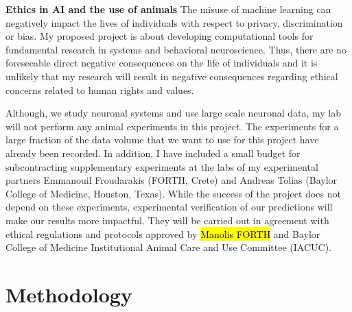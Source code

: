 \documentclass[B2,COG]{ercgrant}
\begin{document}
\textbf{Ethics in AI and the use of animals}
The misuse of machine learning can negatively impact the lives of individuals with respect to privacy, discrimination or bias. 
My proposed project is about developing computational tools for fundamental research in systems and behavioral neuroscience. 
Thus, there are no foreseeable direct negative consequences on the life of individuals and it is unlikely that my research will result in negative consequences regarding ethical concerns related to human rights and values.

Although, we study neuronal systems and use large scale neuronal data, my lab will not perform any animal experiments in this project. 
The experiments for a large fraction of the data volume that we want to use for this project have already been recorded. 
In addition, I have included a small budget for subcontracting supplementary experiments at the labs of my experimental partners Emmanouil Froudarakis (FORTH, Crete) and Andreas Tolias (Baylor College of Medicine, Houston, Texas).  
While the success of the project does not depend on these experiments, experimental verification of our predictions will make our results more impactful. 
They will be carried out in agreement with ethical regulations and protocols approved by \hl{Manolis FORTH} and Baylor College of Medicine Institutional Animal Care and Use Committee (IACUC).
\section{Methodology}
\end{document}
